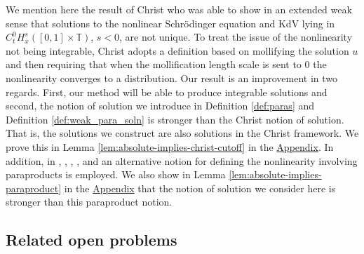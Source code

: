 \documentclass[12pt,reqno,letterpaper]{amsart}
\numberwithin{equation}{section}
\newcommand{\1}{{\bf 1}}
\newcommand{\2}{{\bf 2}}
\newcommand{\T}{\mathbb T}
\theoremstyle{remark}
\theoremstyle{remark}
\begin{document}
We mention here the result of Christ \cite{Christ1} who was able to show in an extended weak sense that solutions to the nonlinear Schr\"{o}dinger equation and \textsf{KdV} lying in $C_t^0 H_x^s([0,1] \times \T)$, $s < 0$, are not unique. To treat the issue of the nonlinearity not being integrable, Christ adopts a definition based on mollifying the solution $u$ and then requiring that when the mollification length scale is sent to $0$ the nonlinearity converges to a distribution. Our result is an improvement in two regards. First, our method will be able to produce integrable solutions and second, the notion of solution we introduce in Definition \ref{def:paras} and Definition \ref{def:weak_para_soln} is stronger than the Christ notion of solution. That is, the solutions we construct are also solutions in the Christ framework. We prove this in Lemma \ref{lem:absolute-implies-christ-cutoff} in the \hyperref[sec:appendix]{Appendix}. In addition, in \cite{ABGN}, \cite{CH}, \cite{Gismondi}, \cite{GR}, and \cite{Pathak} an alternative notion for defining the nonlinearity involving paraproducts is employed. We also show in Lemma \ref{lem:absolute-implies-paraproduct} in the \hyperref[sec:appendix]{Appendix} that the notion of solution we consider here is stronger than this paraproduct notion.

\subsection{Related open problems}

\;
\end{document}
